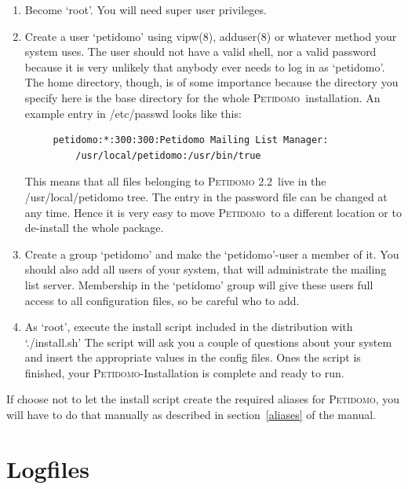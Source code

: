 \documentclass[a4paper,10pt]{scrreprt}
\newcommand{\Petidomo}{{\scshape Peti\-domo}}
\newcommand{\PetidomoTwo}{{\scshape Peti\-domo 2.2}}
\newcommand{\file}[1]{{\sf #1}}
\begin{document}
\begin{enumerate}

\item Become `root'. You will need super user privileges.

\item Create a user `petidomo' using vipw(8),
     adduser(8) or whatever method your system uses. The user should
     not have a valid shell, nor a valid password because it is very
     unlikely that anybody ever needs to log in as `petidomo'. The
     home directory, though, is of some importance because the
     directory you specify here is the base directory for the whole
     \Petidomo\ installation. An example entry in \file{/etc/passwd}
     looks like this:

\begin{verbatim}
     petidomo:*:300:300:Petidomo Mailing List Manager:
         /usr/local/petidomo:/usr/bin/true
\end{verbatim}

     This means that all files belonging to \PetidomoTwo\ live in the
     \file{/usr/lo\-cal/pe\-ti\-domo} tree. The entry in the password file can be
     changed at any time. Hence it is very easy to move \Petidomo\
     to a different location or to de-install the whole package.

\item Create a group `petidomo' and make the `petidomo'-user a member of it.
     You should also add all users of your system, that will administrate
     the mailing list server. Membership in the `petidomo' group will give
     these users full access to all configuration files, so be careful who
     to add.

\item As `root', execute the
     install script included in the distribution with `./install.sh'
     The script will ask you a couple of questions about your system
     and insert the appropriate values in the config files. Ones the
     script is finished, your \Petidomo-Installation is complete and
     ready to run.

\end{enumerate}

If choose not to let the install script create the required aliases
for \Petidomo, you will have to do that manually as described in
section~\ref{aliases} of the manual.

\section{Logfiles}
\end{document}

